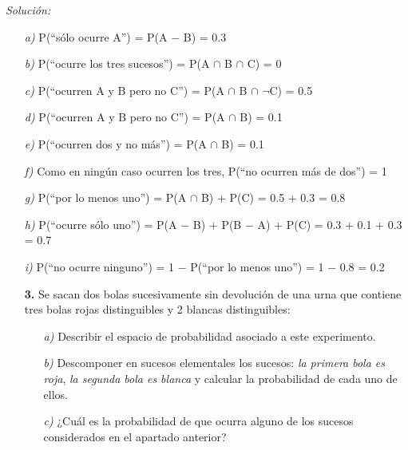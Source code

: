 \documentclass[11pt,a4paper]{article}
\theoremstyle{definition}
\begin{document}
{\color{grey}\hrulefill}

\emph{Solución:}


	\begin{itemize}
		\item[\emph{a)}] P(``sólo ocurre A'') = P(A $-$ B) = 0.3
		\item[\emph{b)}] P(``ocurre los tres sucesos'') = P(A $\cap$ B $\cap$ C) = 0
		\item[\emph{c)}] P(``ocurren A y B pero no C'') = P(A $\cap$ B $\cap$ $\neg$C) = 0.5
		\item[\emph{d)}] P(``ocurren A y B pero no C'') = P(A $\cap$ B) = 0.1
		\item[\emph{e)}] P(``ocurren dos y no más'') = P(A $\cap$ B) = 0.1
		\item[\emph{f)}] Como en ningún caso ocurren los tres, P(``no ocurren más de dos'') = 1
		\item[\emph{g)}] P(``por lo menos uno'') = P(A $\cap$ B) + P(C) = 0.5 + 0.3 = 0.8
		\item[\emph{h)}] P(``ocurre sólo uno'') = P(A $-$ B) + P(B $-$ A) + P(C) = 0.3 + 0.1 + 0.3 = 0.7
		\item[\emph{i)}] P(``no ocurre ninguno'') = 1 $-$ P(``por lo menos uno'') = 1 $-$ 0.8 = 0.2
	\end{itemize}




\pagebreak

\begin{itemize}
	\item[\textbf{3.}] Se sacan dos bolas sucesivamente sin devolución de una urna que contiene tres bolas rojas distinguibles y 2 blancas distinguibles:

\begin{itemize}
	\item[\emph{a)}] Describir el espacio de probabilidad asociado a este experimento.
	\item[\emph{b)}] Descomponer en sucesos elementales los sucesos: \emph{la primera bola es roja}, \emph{la segunda bola es blanca} y calcular la probabilidad de cada uno de ellos.
	\item[\emph{c)}] ¿Cuál es la probabilidad de que ocurra alguno de los sucesos considerados en el apartado anterior?
\end{itemize}
\end{itemize}

{\color{grey}\hrulefill}
\end{document}
